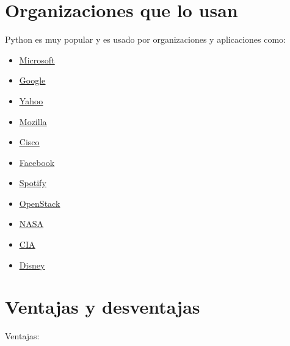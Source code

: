 \documentclass{report}
\newcommand{\link}[2]{\href{#1}{\underline{#2}}}
\begin{document}
\section{Organizaciones que lo usan}

Python es muy popular y es usado por organizaciones y aplicaciones como:

\begin{itemize}
  \item \link{https://www.microsoft.com/en-us/}{Microsoft}

  \item \link{https://www.google.com}{Google}
  
  \item \link{https://www.yahoo.com}{Yahoo}
  
  \item \link{https://www.mozilla.org/en-US/}{Mozilla}
  
  \item \link{https://www.cisco.com}{Cisco}
  
  \item \link{https://www.facebook.com}{Facebook}
  
  \item \link{https://www.spotify.com}{Spotify}
  
  \item \link{https://www.openstack.org}{OpenStack}

  \item \link{https://www.nasa.gov}{NASA}
  
  \item \link{https://www.cia.gov}{CIA}
  
  \item \link{https://www.disney.com}{Disney}
  
\end{itemize}

\section{Ventajas y desventajas}

Ventajas:
\end{document}
